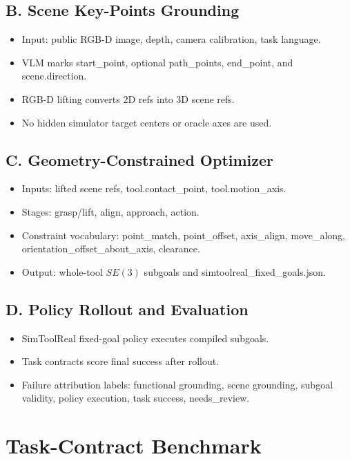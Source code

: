 \documentclass[journal]{IEEEtran}
\begin{document}
\subsection{B. Scene Key-Points Grounding}
\begin{itemize}
  \item Input: public RGB-D image, depth, camera calibration, task language.
  \item VLM marks start\_point, optional path\_points, end\_point, and
  scene.direction.
  \item RGB-D lifting converts 2D refs into 3D scene refs.
  \item No hidden simulator target centers or oracle axes are used.
\end{itemize}

\subsection{C. Geometry-Constrained Optimizer}
\begin{itemize}
  \item Inputs: lifted scene refs, tool.contact\_point, tool.motion\_axis.
  \item Stages: grasp/lift, align, approach, action.
  \item Constraint vocabulary: point\_match, point\_offset, axis\_align,
  move\_along, orientation\_offset\_about\_axis, clearance.
  \item Output: whole-tool $SE(3)$ subgoals and simtoolreal\_fixed\_goals.json.
\end{itemize}

\subsection{D. Policy Rollout and Evaluation}
\begin{itemize}
  \item SimToolReal fixed-goal policy executes compiled subgoals.
  \item Task contracts score final success after rollout.
  \item Failure attribution labels: functional grounding, scene grounding,
  subgoal validity, policy execution, task success, needs\_review.
\end{itemize}

\section{Task-Contract Benchmark}
\end{document}
